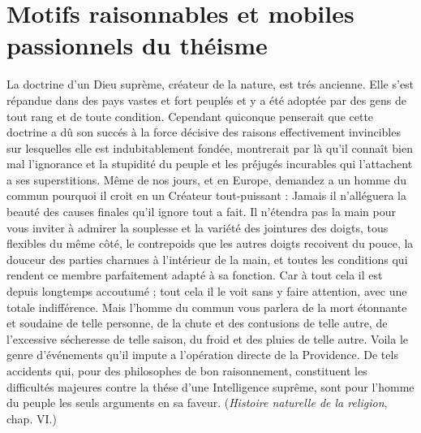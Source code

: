 
\section{Motifs raisonnables et mobiles passionnels du théisme}

La doctrine d’un Dieu suprème, créateur de la nature,
est trés ancienne. Elle s’est répandue dans des pays vastes
et fort peuplés et y a été adoptée par des gens de tout
rang et de toute condition. Cependant quiconque penserait
que cette doctrine a dû son succés à la force décisive des
raisons effectivement invincibles sur lesquelles elle est
indubitablement fondée, montrerait par là qu’il connaît
bien mal l'ignorance et la stupidité du peuple et les
préjugés incurables qui l’attachent a ses superstitions.
Même de nos jours, et en Europe, demandez a un homme
du commun pourquoi il croit en un Créateur tout-puissant :
Jamais il n’alléguera la beauté des causes finales qu’il
ignore tout a fait. Il n’étendra pas la main pour vous
inviter à admirer la souplesse et la variété des jointures
des doigts, tous flexibles du même côté, le contrepoids
que les autres doigts recoivent du pouce, la douceur des
parties charnues à l’intérieur de la main, et toutes les
conditions qui rendent ce membre parfaitement adapté
à sa fonction. Car à tout cela il est depuis longtemps
accoutumé ; tout cela il le voit sans y faire attention,
avec une totale indifférence. Mais l'homme du commun
vous parlera de la mort étonnante et soudaine de telle
personne, de la chute et des contusions de telle autre, de
l'excessive sécheresse de telle saison, du froid et des pluies
de telle autre. Voila le genre d’événements qu’il impute a
l'opération directe de la Providence. De tels accidents qui,
pour des philosophes de bon raisonnement, constituent
les difficultés majeures contre la thése d’une Intelligence
suprême, sont pour l’homme du peuple les seuls arguments
en sa faveur. ({\it Histoire naturelle de la religion}, chap. VI.)

